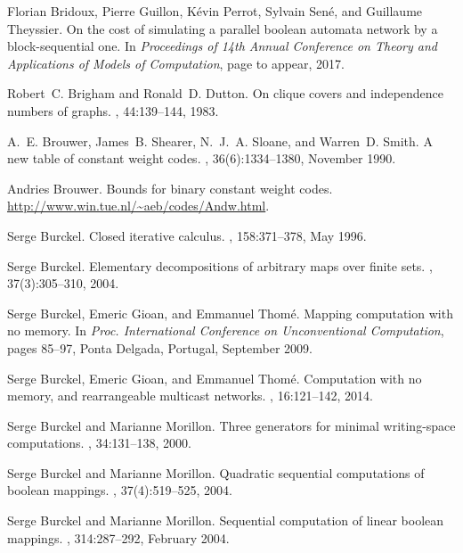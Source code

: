 \documentclass[a4paper, 11pt]{book}
\numberwithin{equation}{section}
\theoremstyle{plain}
\renewcommand{\(}{\ldbrack}
\renewcommand{\)}{\rdbrack}
\begin{document}
\begin{thebibliography}{100}
Florian Bridoux, Pierre Guillon, K\'evin Perrot, Sylvain Sen\'e, and Guillaume
  Theyssier.
\newblock On the cost of simulating a parallel boolean automata network by a
  block-sequential one.
\newblock In {\em Proceedings of 14th Annual Conference on Theory and
  Applications of Models of Computation}, page to appear, 2017.

Robert~C. Brigham and Ronald~D. Dutton.
\newblock On clique covers and independence numbers of graphs.
, 44:139--144, 1983.

A.~E. Brouwer, James~B. Shearer, N.~J.~A. Sloane, and Warren~D. Smith.
\newblock A new table of constant weight codes.
, 36(6):1334--1380,
  November 1990.

Andries Brouwer.
\newblock Bounds for binary constant weight codes.
\newblock \url{http://www.win.tue.nl/~aeb/codes/Andw.html}.

Serge Burckel.
\newblock Closed iterative calculus.
, 158:371--378, May 1996.

Serge Burckel.
\newblock Elementary decompositions of arbitrary maps over finite sets.
, 37(3):305--310, 2004.

Serge Burckel, Emeric Gioan, and Emmanuel Thom\'e.
\newblock Mapping computation with no memory.
\newblock In {\em Proc. International Conference on Unconventional
  Computation}, pages 85--97, Ponta Delgada, Portugal, September 2009.

Serge Burckel, Emeric Gioan, and Emmanuel Thom\'e.
\newblock Computation with no memory, and rearrangeable multicast networks.
,
  16:121--142, 2014.

Serge Burckel and Marianne Morillon.
\newblock Three generators for minimal writing-space computations.
, 34:131--138, 2000.

Serge Burckel and Marianne Morillon.
\newblock Quadratic sequential computations of boolean mappings.
, 37(4):519--525, 2004.

Serge Burckel and Marianne Morillon.
\newblock Sequential computation of linear boolean mappings.
, 314:287--292, February 2004.


\end{thebibliography}
\end{document}
